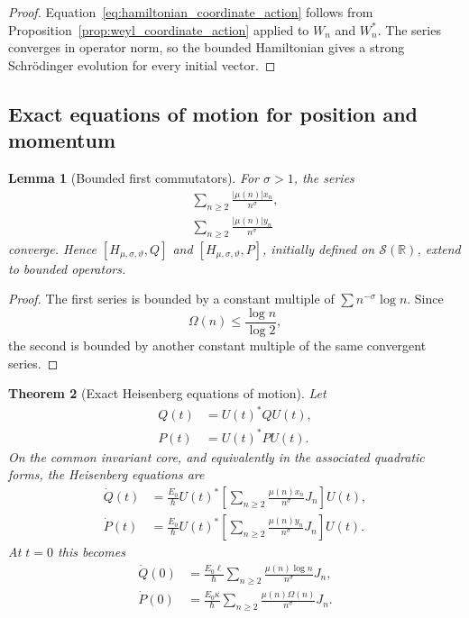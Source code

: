 \documentclass[11pt]{amsart}
\numberwithin{equation}{section}
\theoremstyle{plain}
\newtheorem{theorem}{Theorem}[section]
\newtheorem{lemma}[theorem]{Lemma}
\theoremstyle{definition}
\theoremstyle{remark}
\newcommand{\R}{\mathbb{R}}
\newcommand{\Sch}{\mathcal{S}}
\newcommand{\Om}{\Omega}
\begin{document}
\begin{proof}
Equation~\eqref{eq:hamiltonian_coordinate_action} follows from
Proposition~\ref{prop:weyl_coordinate_action} applied to $W_n$ and $W_n^*$.
The series converges in operator norm, so the bounded Hamiltonian gives a
strong Schr\"odinger evolution for every initial vector.
\end{proof}

\subsection{Exact equations of motion for position and momentum}
\label{subsec:equations_of_motion}

\begin{lemma}[Bounded first commutators]
\label{lem:bounded_first_commutators}
For $\sigma>1$, the series
\begin{align}
\sum_{n\ge2}
\frac{|\mu(n)|x_n}{n^{\sigma}},
\label{eq:x_commutator_sum}\\
\sum_{n\ge2}
\frac{|\mu(n)|y_n}{n^{\sigma}}
\label{eq:y_commutator_sum}
\end{align}
converge.  Hence $[H_{\mu,\sigma,\vartheta},Q]$ and
$[H_{\mu,\sigma,\vartheta},P]$, initially defined on $\Sch(\R)$, extend to
bounded operators.
\end{lemma}

\begin{proof}
The first series is bounded by a constant multiple of
$\sum n^{-\sigma}\log n$.  Since
\begin{equation}
\Om(n)\le\frac{\log n}{\log2},
\label{eq:Omega_log_bound}
\end{equation}
the second is bounded by another constant multiple of the same convergent
series.
\end{proof}

\begin{theorem}[Exact Heisenberg equations of motion]
\label{thm:equations_of_motion}
Let
\begin{align}
Q(t)
&=U(t)^*QU(t),
\label{eq:Qt_definition}\\
P(t)
&=U(t)^*PU(t).
\label{eq:Pt_definition}
\end{align}
On the common invariant core, and equivalently in the associated quadratic
forms, the Heisenberg equations are
\begin{align}
\dot Q(t)
&=
\frac{E_0}{\hbar}
U(t)^*
\left[
\sum_{n\ge2}
\frac{\mu(n)x_n}{n^{\sigma}}J_n
\right]
U(t),
\label{eq:Q_equation_motion}\\
\dot P(t)
&=
\frac{E_0}{\hbar}
U(t)^*
\left[
\sum_{n\ge2}
\frac{\mu(n)y_n}{n^{\sigma}}J_n
\right]
U(t).
\label{eq:P_equation_motion}
\end{align}
At $t=0$ this becomes
\begin{align}
\dot Q(0)
&=
\frac{E_0\ell}{\hbar}
\sum_{n\ge2}
\frac{\mu(n)\log n}{n^{\sigma}}J_n,
\label{eq:Qdot_zero}\\
\dot P(0)
&=
\frac{E_0\kappa}{\hbar}
\sum_{n\ge2}
\frac{\mu(n)\Om(n)}{n^{\sigma}}J_n.
\label{eq:Pdot_zero}
\end{align}
\end{theorem}
\end{document}
